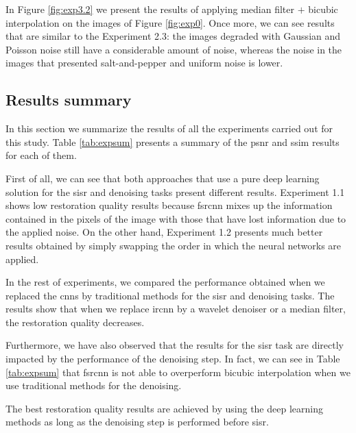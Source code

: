 In Figure \ref{fig:exp3.2} we present the results of applying median filter $+$ bicubic interpolation on the images of Figure \ref{fig:exp0}. Once more, we can see results that are similar to the Experiment 2.3: the images degraded with Gaussian and Poisson noise still have a considerable amount of noise, whereas the noise in the images that presented salt-and-pepper and uniform noise is lower.

\subsection{Results summary}
In this section we summarize the results of all the experiments carried out for this study. Table \ref{tab:expsum} presents a summary of the \gls{psnr} and \gls{ssim} results for each of them.

First of all, we can see that both approaches that use a pure deep learning solution for the \gls{sisr} and denoising tasks present different results. Experiment 1.1 shows low restoration quality results because \gls{fsrcnn} mixes up the information contained in the pixels of the image with those that have lost information due to the applied noise. On the other hand, Experiment 1.2 presents much better results obtained by simply swapping the order in which the neural networks are applied.

In the rest of experiments, we compared the performance obtained when we replaced the \glspl{cnn} by traditional methods for the \gls{sisr} and denoising tasks. The results show that when we replace \gls{ircnn} by a wavelet denoiser or a median filter, the restoration quality decreases.

Furthermore, we have also observed that the results for the \gls{sisr} task are directly impacted by the performance of the denoising step. In fact, we can see in Table \ref{tab:expsum} that \gls{fsrcnn} is not able to overperform bicubic interpolation when we use traditional methods for the denoising.

The best restoration quality results are achieved by using the deep learning methods as long as the denoising step is performed before \gls{sisr}.



